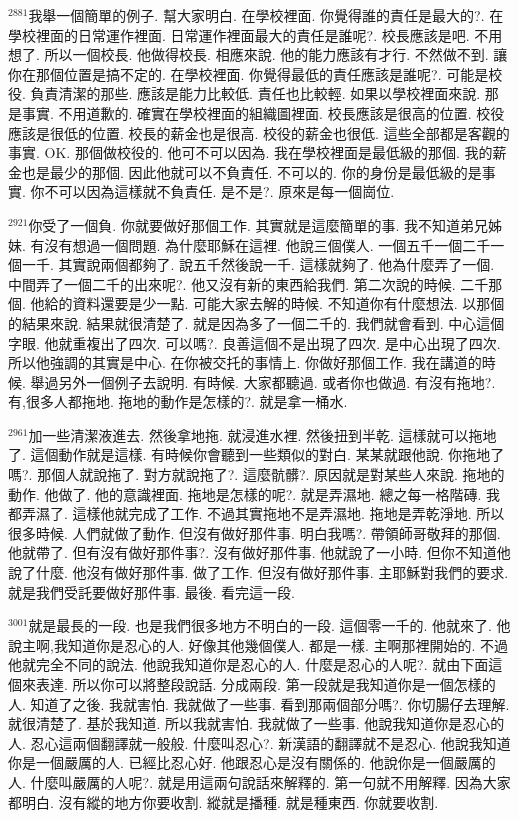 \documentclass{book}
\begin{document}
$^{2881}$我舉一個簡單的例子.
幫大家明白.
在學校裡面.
你覺得誰的責任是最大的?.
在學校裡面的日常運作裡面.
日常運作裡面最大的責任是誰呢?.
校長應該是吧.
不用想了.
所以一個校長.
他做得校長.
相應來說.
他的能力應該有才行.
不然做不到.
讓你在那個位置是搞不定的.
在學校裡面.
你覺得最低的責任應該是誰呢?.
可能是校役.
負責清潔的那些.
應該是能力比較低.
責任也比較輕.
如果以學校裡面來說.
那是事實.
不用道歉的.
確實在學校裡面的組織圖裡面.
校長應該是很高的位置.
校役應該是很低的位置.
校長的薪金也是很高.
校役的薪金也很低.
這些全部都是客觀的事實.
OK.
那個做校役的.
他可不可以因為.
我在學校裡面是最低級的那個.
我的薪金也是最少的那個.
因此他就可以不負責任.
不可以的.
你的身份是最低級的是事實.
你不可以因為這樣就不負責任.
是不是?.
原來是每一個崗位.

$^{2921}$你受了一個負.
你就要做好那個工作.
其實就是這麼簡單的事.
我不知道弟兄姊妹.
有沒有想過一個問題.
為什麼耶穌在這裡.
他說三個僕人.
一個五千一個二千一個一千.
其實說兩個都夠了.
說五千然後說一千.
這樣就夠了.
他為什麼弄了一個.
中間弄了一個二千的出來呢?.
他又沒有新的東西給我們.
第二次說的時候.
二千那個.
他給的資料還要是少一點.
可能大家去解的時候.
不知道你有什麼想法.
以那個的結果來說.
結果就很清楚了.
就是因為多了一個二千的.
我們就會看到.
中心這個字眼.
他就重複出了四次.
可以嗎?.
良善這個不是出現了四次.
是中心出現了四次.
所以他強調的其實是中心.
在你被交托的事情上.
你做好那個工作.
我在講道的時候.
舉過另外一個例子去說明.
有時候.
大家都聽過.
或者你也做過.
有沒有拖地?.
有,很多人都拖地.
拖地的動作是怎樣的?.
就是拿一桶水.

$^{2961}$加一些清潔液進去.
然後拿地拖.
就浸進水裡.
然後扭到半乾.
這樣就可以拖地了.
這個動作就是這樣.
有時候你會聽到一些類似的對白.
某某就跟他說.
你拖地了嗎?.
那個人就說拖了.
對方就說拖了?.
這麼骯髒?.
原因就是對某些人來說.
拖地的動作.
他做了.
他的意識裡面.
拖地是怎樣的呢?.
就是弄濕地.
總之每一格階磚.
我都弄濕了.
這樣他就完成了工作.
不過其實拖地不是弄濕地.
拖地是弄乾淨地.
所以很多時候.
人們就做了動作.
但沒有做好那件事.
明白我嗎?.
帶領師哥敬拜的那個.
他就帶了.
但有沒有做好那件事?.
沒有做好那件事.
他就說了一小時.
但你不知道他說了什麼.
他沒有做好那件事.
做了工作.
但沒有做好那件事.
主耶穌對我們的要求.
就是我們受託要做好那件事.
最後.
看完這一段.

$^{3001}$就是最長的一段.
也是我們很多地方不明白的一段.
這個零一千的.
他就來了.
他說主啊,我知道你是忍心的人.
好像其他幾個僕人.
都是一樣.
主啊那裡開始的.
不過他就完全不同的說法.
他說我知道你是忍心的人.
什麼是忍心的人呢?.
就由下面這個來表達.
所以你可以將整段說話.
分成兩段.
第一段就是我知道你是一個怎樣的人.
知道了之後.
我就害怕.
我就做了一些事.
看到那兩個部分嗎?.
你切腸仔去理解.
就很清楚了.
基於我知道.
所以我就害怕.
我就做了一些事.
他說我知道你是忍心的人.
忍心這兩個翻譯就一般般.
什麼叫忍心?.
新漢語的翻譯就不是忍心.
他說我知道你是一個嚴厲的人.
已經比忍心好.
他跟忍心是沒有關係的.
他說你是一個嚴厲的人.
什麼叫嚴厲的人呢?.
就是用這兩句說話來解釋的.
第一句就不用解釋.
因為大家都明白.
沒有縱的地方你要收割.
縱就是播種.
就是種東西.
你就要收割.
\end{document}
